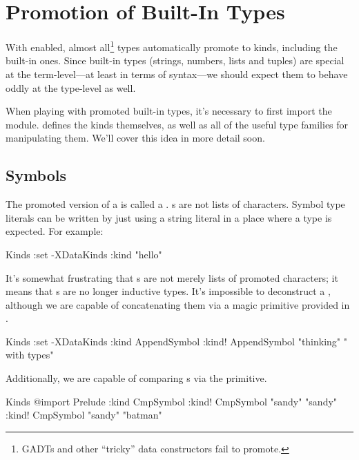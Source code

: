 \documentclass[book.tex]{subfiles}
\begin{document}
\section{Promotion of Built-In Types}

\begin{necessary}[Imports]
\end{necessary}

With  enabled, almost all\footnote{GADTs and other ``tricky''
data constructors fail to promote.} types automatically promote to kinds,
including the built-in ones. Since built-in types (strings, numbers, lists and
tuples) are special at the term-level---at least in terms of syntax---we should
expect them to behave oddly at the type-level as well.

When playing with promoted built-in types, it's necessary to first import the
 module.  defines the kinds themselves, as
well as all of the useful type families for manipulating them. We'll cover this
idea in more detail soon.


\subsection{Symbols}

The promoted version of a  is called a . s
are not lists of characters. Symbol type literals can be written by just using a
string literal in a place where a type is expected. For example:

\begin{dorepl}{Kinds}
:set -XDataKinds
:kind "hello"
\end{dorepl}

It's somewhat frustrating that s are not merely lists of promoted
characters; it means that s are no longer inductive types. It's
impossible to deconstruct a , although we are capable of
concatenating them via a magic  primitive provided in
.

\begin{dorepl}{Kinds}
:set -XDataKinds
:kind AppendSymbol
:kind! AppendSymbol "thinking" " with types"
\end{dorepl}

Additionally, we are capable of comparing s via the 
primitive.

\begin{dorepl}{Kinds}
@import Prelude
:kind CmpSymbol
:kind! CmpSymbol "sandy" "sandy"
:kind! CmpSymbol "sandy" "batman"
\end{dorepl}
\end{document}
